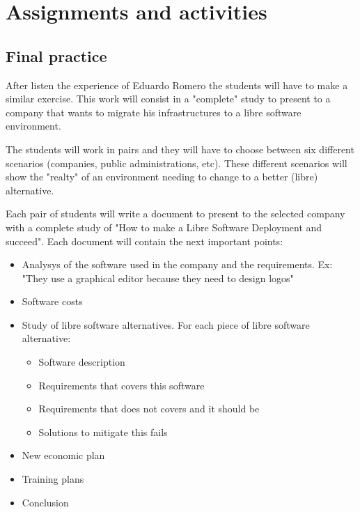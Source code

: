 \documentclass[a4paper]{article}
\begin{document}
\section{Assignments and activities}

\subsection{Final practice}

After listen the experience of Eduardo Romero the students will have to make a similar exercise. This work will consist in a "complete" study to present to a company that wants to migrate his infrastructures to a libre software environment. 

The students will work in pairs and they will have to choose between six different scenarios (companies, public administrations, etc). These different scenarios will show the "realty" of an environment needing to change to a better (libre) alternative. 

Each pair of students will write a document to present to the selected company with a complete study of "How to make a Libre Software Deployment and succeed". Each document will contain the next important points:

\begin{itemize}
\item Analysys of the software used in the company and the requirements. Ex: "They use a graphical editor because they need to design logos"
\item Software costs
\item Study of libre software alternatives. For each piece of libre software alternative:
	\begin{itemize}
	\item Software description
	\item Requirements that covers this software
	\item Requirements that does not covers and it should be
	\item Solutions to mitigate this fails
	\end{itemize}
\item New economic plan
\item Training plans 
\item Conclusion

\end{itemize}


\end{document}
